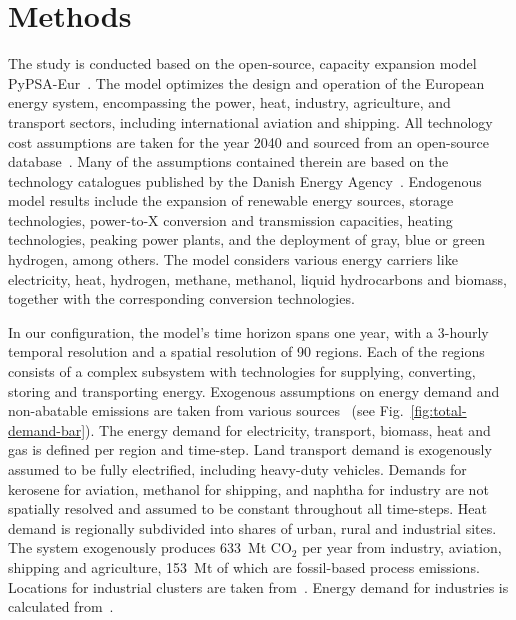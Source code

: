 \documentclass[twocolumn]{article}
\newcommand{\carbon}{CO$_2$}
\begin{document}
\section*{Methods}
\label{sec:methodology}

The study is conducted based on the open-source, capacity expansion model PyPSA-Eur~\cite{horschPyPSAEurOpenOptimisation2018,brownSynergiesSectorCoupling2018,PyPSAEurSecSectorCoupledOpen2023}.
The model optimizes the design and operation of the European energy system, encompassing the power, heat, industry, agriculture, and transport sectors, including international aviation and shipping.
All technology cost assumptions are taken for the year 2040 and sourced from an open-source database~\cite{lisazeyenPyPSATechnologydataTechnology2023}.
Many of the assumptions contained therein are based on the technology catalogues published by the Danish Energy Agency~\cite{danishenergyagencyTechnologyDataGeneration2019,thedanishenergyagencyTechnologyDataCarbon2023}.
Endogenous model results include the expansion of renewable energy sources, storage technologies, power-to-X conversion and transmission capacities, heating technologies, peaking power plants, and the deployment of gray, blue or green hydrogen, among others.
The model considers various energy carriers like electricity, heat, hydrogen, methane, methanol, liquid hydrocarbons and biomass, together with the corresponding conversion technologies.



%
In our configuration, the model's time horizon spans one year, with a 3-hourly temporal resolution and a spatial resolution of 90 regions. Each of the regions consists of a complex subsystem with technologies for supplying, converting, storing and transporting energy. Exogenous assumptions on energy demand and non-abatable emissions are taken from various sources~\cite{piamanzGeoreferencedIndustrialSites2018,muehlenpfordtTimeSeries2019,mantzosJRCIDEES20152018,NationalEmissionsReported2023,EurostatCompleteEnergyBalance,uwekrienDemandlib2023} (see Fig.~\ref{fig:total-demand-bar}). The energy demand for electricity, transport, biomass, heat and gas is defined per region and time-step.
Land transport demand is exogenously assumed to be fully electrified, including heavy-duty vehicles.
Demands for kerosene for aviation, methanol for shipping, and naphtha for industry are not spatially resolved and assumed to be constant throughout all time-steps.
Heat demand is regionally subdivided into shares of urban, rural and industrial sites.
The system exogenously produces 633~Mt \carbon{} per year from industry, aviation, shipping and agriculture, 153~Mt of which are fossil-based process emissions.
Locations for industrial clusters are taken from~\cite{hotmaps_industrial_db}. Energy demand for industries is calculated from~\cite{mantzosJRCIDEES20152018}.
\end{document}
